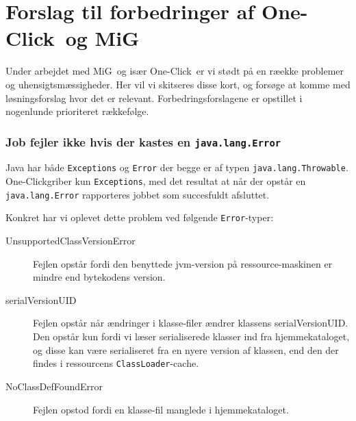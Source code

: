 \documentclass[draft,a4paper,11pt]{article}
\newcommand{\mig}{MiG}
\newcommand{\oc}{One-Click}
\begin{document}



\section{Forslag til forbedringer af \oc\ og \mig}\label{forbedringer}

Under arbejdet med \mig\ og især \oc\ er vi stødt på en ræekke problemer og uhensigtsmæssigheder. Her vil vi skitseres disse kort, og forsøge at komme med løsningsforslag hvor det er relevant. Forbedringsforslagene er opstillet i nogenlunde prioriteret rækkefølge.

\subsubsection*{Job fejler ikke hvis der kastes en \texttt{java.lang.Error}}
Java har både \texttt{Exceptions} og \texttt{Error} der begge er af typen \texttt{java.lang.Throwable}. \oc griber kun \texttt{Exceptions}, med det resultat at når der opstår en \texttt{java.lang.Error} rapporteres jobbet som succesfuldt afsluttet. 

Konkret har vi oplevet dette problem ved følgende \texttt{Error}-typer:
\begin{description}
	\item[UnsupportedClassVersionError]	Fejlen opstår fordi den benyttede jvm-version på ressource-maskinen er mindre end bytekodens version.
	\item[serialVersionUID]	Fejlen opstår når ændringer i klasse-filer ændrer klassens serialVersionUID. Den opstår kun fordi vi læser serialiserede klasser ind fra hjemmekataloget, og disse kan være serialiseret fra en nyere version af klassen, end den der findes i ressourcens \texttt{ClassLoader}-cache. 
	\item[NoClassDefFoundError]	Fejlen opstod fordi en klasse-fil manglede i hjemmekataloget.  
\end{description}
\end{document}
